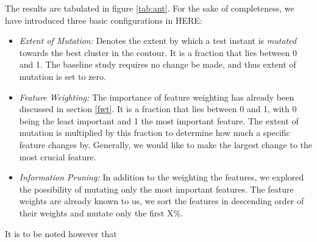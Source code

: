 \documentclass[conference]{IEEEtran}
\newcommand{\bi}{\begin{itemize}}
\newcommand{\ei}{\end{itemize}}
\begin{document}
{ 
The results are tabulated in figure \ref{tab:ant}. For the sake of completeness, we have introduced three basic configurations in HERE: 
\bi
\item \textit{Extent of Mutation:} Denotes the extent by which a test instant is \textit{mutated} towards the best cluster in the contour. It is a fraction that lies between 0 and 1. The baseline study requires no change be made, and thus extent of mutation is set to zero.
\item \textit{Feature Weighting:} The importance of feature weighting has already been discussed in section \ref{fwt}. It is a fraction that lies between 0 and 1, with 0 being the least important and 1 the most important feature. The extent of mutation is multiplied by this fraction to determine how much a specific feature changes by. Generally, we would like to make the largest change to the most crucial feature.
\item \textit{Information Pruning:} In addition to the weighting the features, we explored the possibility of mutating only the most important features. The feature weights are already known to us, we sort the features in descending order of their weights and mutate only the first X\%.
\ei
It is to be noted however that 


\begin{figure}[htbp!]


\end{figure}}
\end{document}
